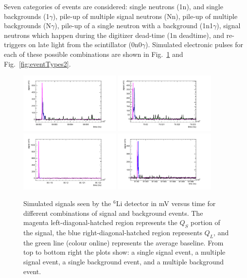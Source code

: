 \documentclass[letter,twocolumn,preprint,3p,numbers,sort&compress]{elsarticle}
\begin{document}
Seven categories of events are considered: single neutrons (1n), and
single backgrounds (1$\gamma$), pile-up of multiple signal neutrons
(Nn), pile-up of multiple backgrounds (N$\gamma$), pile-up of a single
neutron with a background (1n1$\gamma$), signal neutrons which happen
during the digitizer dead-time (1n deadtime), and re-triggers on late
light from the scintillator (0n0$\gamma$).  Simulated electronic
pulses for each of these possible combinations are shown in
Fig.~\ref{fig:eventTypes} and Fig.~\ref{fig:eventTypes2}.

\begin{figure}[!htpb]
\centering
\includegraphics[width=0.45\textwidth]{figures/signal1.pdf}
\includegraphics[width=0.45\textwidth]{figures/mixed1.pdf}
\includegraphics[width=0.45\textwidth]{figures/gamma1.pdf}
\includegraphics[width=0.45\textwidth]{figures/gammapileup1.pdf}
\caption{ Simulated signals seen by the $^{6}$Li detector in mV versus
  time for different combinations of signal and background events.
  The magenta left-diagonal-hatched region represents the $Q_S$
  portion of the signal, the blue right-diagonal-hatched region
  represents $Q_L$, and the green line (colour online) represents the
  average baseline.  From top to bottom right the plots show: a single
  signal event, a multiple signal event, a single background event,
  and a multiple background event. }\label{fig:eventTypes}
\end{figure}
\end{document}
